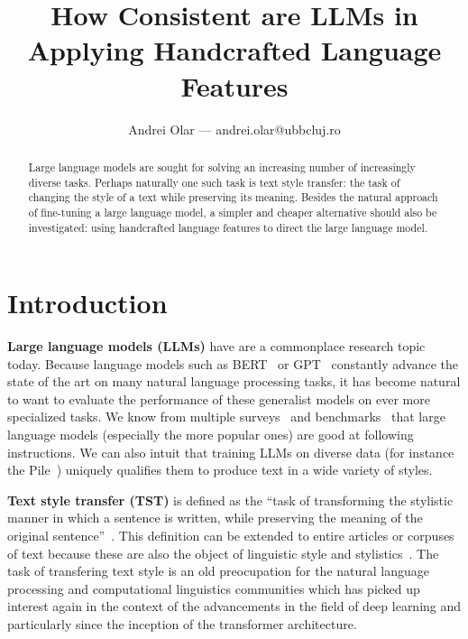 \documentclass[runningheads,a4paper,11pt]{article}
\begin{document}
\title{How Consistent are LLMs in Applying Handcrafted Language Features}
\author{Andrei Olar --- andrei.olar@ubbcluj.ro}
\maketitle
\begin{abstract}
    Large language models are sought for solving an increasing number of
    increasingly diverse tasks. Perhaps naturally one such task is text style
    transfer: the task of changing the style of a text while preserving its
    meaning. Besides the natural approach of fine-tuning a large language model,
    a simpler and cheaper alternative should also be investigated: using
    handcrafted language features to direct the large language model.
\end{abstract}

\section{Introduction}\label{introduction}

\textbf{Large language models (LLMs)} have are a commonplace research topic
today.
Because language models such as BERT~\cite{devlin2018bert} or
GPT~\cite{gpt-2018,gpt2-2019,gpt3-2020} constantly advance the state of the art
on many natural language processing tasks, it has become natural to want to
evaluate the performance of these generalist models on ever more specialized
tasks.
We know from multiple surveys~\cite{minaee2024llmsurvey,zhao2023survey} and
benchmarks~\cite{papcode2024hellaswag,chiang2024chatbot} that large language
models (especially the more popular ones) are good at following instructions.
We can also intuit that training LLMs on diverse data (for instance the
Pile~\cite{gao2020pile}) uniquely qualifies them to produce text in a wide
variety of styles.

\textbf{Text style transfer (TST)} is defined as the ``task of transforming the
stylistic manner in which a sentence is written, while preserving the meaning of
the original sentence''~\cite{tst-review-2021}.
This definition can be extended to entire articles or corpuses of text because
these are also the object of linguistic style and
stylistics~\cite{lugea2023stylistics}.
The task of transfering text style is an old preocupation for the natural
language processing and computational linguistics communities which has picked
up interest again in the context of the advancements in the field of deep
learning and particularly since the inception of the transformer architecture.
\end{document}
